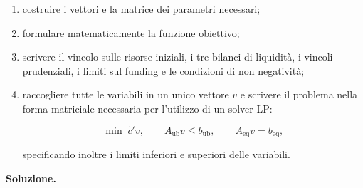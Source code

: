 \begin{exercise}
\begin{enumerate}
\item costruire i vettori e la matrice dei parametri necessari;

\item formulare matematicamente la funzione obiettivo;

\item scrivere il vincolo sulle risorse iniziali, i tre bilanci di liquidit\`a,
i vincoli prudenziali, i limiti sul funding e le condizioni di non negativit\`a;

\item raccogliere tutte le variabili in un unico vettore $v$ e scrivere il
problema nella forma matriciale necessaria per l'utilizzo di un solver LP:

\[
\min\;\widetilde c'v,
\qquad
A_{\mathrm{ub}}v\leq b_{\mathrm{ub}},
\qquad
A_{\mathrm{eq}}v=b_{\mathrm{eq}},
\]

specificando inoltre i limiti inferiori e superiori delle variabili.
\end{enumerate}

\end{exercise}

\noindent
\textbf{Soluzione.}

